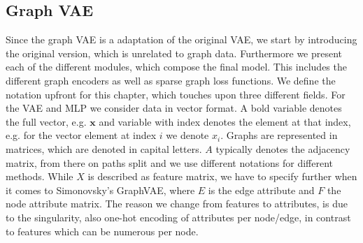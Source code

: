 



\subsection{Graph VAE}

Since the graph VAE is a adaptation of the original VAE, we start by introducing the original version, which is unrelated to graph data. Furthermore we present each of the different modules, which compose the final model. This includes the different graph encoders as well as sparse graph loss functions. We define the notation upfront for this chapter, which touches upon three different fields. For the VAE and MLP we consider data in vector format. A bold variable denotes the full vector, e.g. $\mathbf{x}$ and variable with index denotes the element at that index, e.g. for the vector element at index $i$ we denote $x_i$. Graphs are represented in matrices, which are denoted in capital letters. $A$ typically denotes the adjacency matrix, from there on paths split and we use different notations for different methods. While $X$ is described as feature matrix, we have to specify further when it comes to Simonovsky's GraphVAE, where $E$ is the edge attribute and $F$ the node attribute matrix. The reason we change from features to attributes, is due to the singularity, also one-hot encoding of attributes per node/edge, in contrast to features which can be numerous per node.


